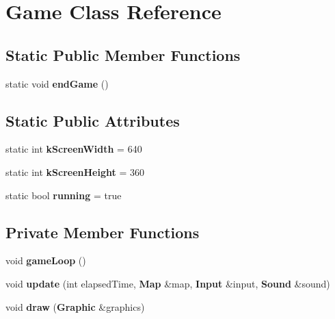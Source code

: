 \section{Game Class Reference}
\label{class_game}
\subsection*{Static Public Member Functions}
\begin{DoxyCompactItemize}
\item 
static void {\bfseries end\+Game} ()\label{class_game_a1dd53b1421401d56b123448b3009ec42}

\end{DoxyCompactItemize}
\subsection*{Static Public Attributes}
\begin{DoxyCompactItemize}
\item 
static int {\bfseries k\+Screen\+Width} = 640\label{class_game_a5cd5507c48083efe21870edc010b0092}

\item 
static int {\bfseries k\+Screen\+Height} = 360\label{class_game_a987ce043b9c2dca54691ddc4146b6411}

\item 
static bool {\bfseries running} = true\label{class_game_a8ca5b9f8a62990e6022de17785beac2c}

\end{DoxyCompactItemize}
\subsection*{Private Member Functions}
\begin{DoxyCompactItemize}
\item 
void {\bfseries game\+Loop} ()\label{class_game_aede5f46c8c7bbbaf8459eeec397a11e7}

\item 
void {\bfseries update} (int elapsed\+Time, {\bf Map} \&map, {\bf Input} \&input, {\bf Sound} \&sound)\label{class_game_a500c9c05c044487957dfc3c7e5d7df99}

\item 
void {\bfseries draw} ({\bf Graphic} \&graphics)\label{class_game_adddab9024dc030c923651ed737f1f6b5}

\end{DoxyCompactItemize}
